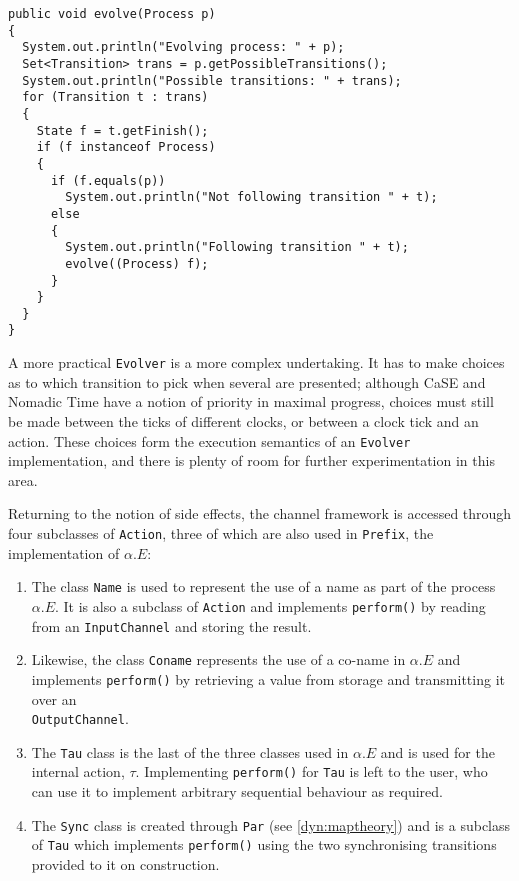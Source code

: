 \begin{verbatim}
public void evolve(Process p)
{
  System.out.println("Evolving process: " + p);
  Set<Transition> trans = p.getPossibleTransitions();
  System.out.println("Possible transitions: " + trans);
  for (Transition t : trans)
  {
    State f = t.getFinish();
    if (f instanceof Process)
    {
      if (f.equals(p))
        System.out.println("Not following transition " + t);
      else
      {
        System.out.println("Following transition " + t);
        evolve((Process) f);
      }
    }
  }
}
\end{verbatim}

A more practical \texttt{Evolver} is a more complex undertaking.  It
has to make choices as to which transition to pick when several are
presented; although CaSE and Nomadic Time have a notion of priority in
maximal progress, choices must still be made between the ticks of
different clocks, or between a clock tick and an action.  These
choices form the execution semantics of an \texttt{Evolver}
implementation, and there is plenty of room for further
experimentation in this area.

Returning to the notion of side effects, the channel framework is
accessed through four subclasses of \texttt{Action}, three of which
are also used in \texttt{Prefix}, the implementation of $\alpha.E$:

\begin{enumerate}
\item The class \texttt{Name} is used to represent the use of a name
  as part of the process $\alpha.E$.  It is also a subclass of
  \texttt{Action} and implements \texttt{perform()} by reading from an
  \texttt{InputChannel} and storing the result.
\item Likewise, the class \texttt{Coname} represents the use of a
  co-name in $\alpha.E$ and implements \texttt{perform()} by
  retrieving a value from storage and transmitting it over an \\
  \texttt{OutputChannel}.
\item The \texttt{Tau} class is the last of the three classes used in
  $\alpha.E$ and is used for the internal action, $\tau$.
  Implementing \texttt{perform()} for \texttt{Tau} is left to the
  user, who can use it to implement arbitrary sequential behaviour as
  required.
\item The \texttt{Sync} class is created through \texttt{Par} (see
  \ref{dyn:maptheory}) and is a subclass of \texttt{Tau} which
  implements \texttt{perform()} using the two synchronising
  transitions provided to it on construction.
\end{enumerate}

